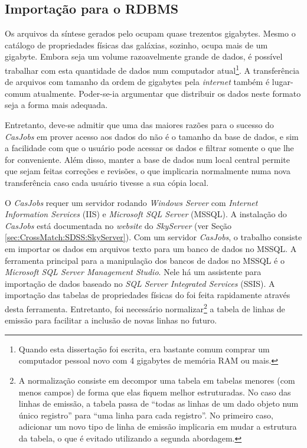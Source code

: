 \subsection{Importação para o RDBMS}

Os arquivos da síntese gerados pelo \starlight ocupam quase trezentos gigabytes.
Mesmo o catálogo de propriedades físicas das galáxias, sozinho, ocupa mais de um
gigabyte. Embora seja um volume razoavelmente grande de dados, é possível
trabalhar com esta quantidade de dados num computador atual\footnote{Quando esta
dissertação foi escrita, era bastante comum comprar um computador pessoal novo
com 4 gigabytes de memória RAM ou mais.}. A transferência de arquivos com
tamanho da ordem de gigabytes pela {\em internet} também é lugar-comum
atualmente. Poder-se-ia argumentar que distribuir os dados neste formato seja
a forma mais adequada.

Entretanto, deve-se admitir que uma das maiores razões para o sucesso do {\em
CasJobs} em prover acesso aos dados do \SDSS não é o tamanho da base de dados, e
sim a facilidade com que o usuário pode acessar os dados e filtrar somente o que
lhe for conveniente. Além disso, manter a base de dados num local central
permite que sejam feitas correções e revisões, o que implicaria normalmente numa
nova transferência caso cada usuário tivesse a sua cópia local.

O {\em CasJobs} requer um servidor rodando {\em Windows Server} com {\em
Internet Information Services} (IIS) e {\em Microsoft SQL Server} (MSSQL). A
instalação do {\em CasJobs} está documentada no {\em website} do {\em SkyServer}
(ver Seção \ref{sec:CrossMatch:SDSS:SkyServer}). Com um servidor {\em CasJobs},
o trabalho consiste em importar os dados em arquivos texto para um banco de
dados no MSSQL. A ferramenta principal para a manipulação dos bancos de dados no
MSSQL é o {\em Microsoft SQL Server Management Studio}. Nele há um assistente
para importação de dados baseado no {\em SQL Server Integrated Services} (SSIS).
A importação das tabelas de propriedades físicas do \starlight foi feita
rapidamente através desta ferramenta. Entretanto, foi necessário
normalizar\footnote{A normalização consiste em decompor uma tabela em tabelas
menores (com menos campos) de forma que elas fiquem melhor estruturadas. No caso
das linhas de emissão, a tabela passa de ``todas as linhas de um dado objeto num
único registro'' para ``uma linha para cada registro''. No primeiro caso,
adicionar um novo tipo de linha de emissão implicaria em mudar a estrutura da
tabela, o que é evitado utilizando a segunda abordagem.} a tabela de linhas de
emissão para facilitar a inclusão de novas linhas no futuro.

